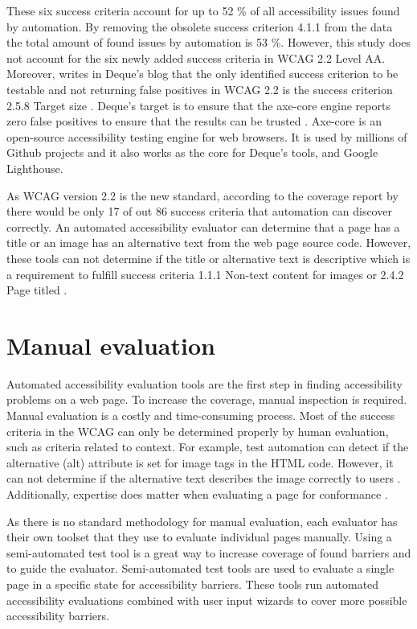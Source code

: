 These six success criteria account for up to 52 \% of all accessibility issues found by automation. By removing the obsolete success criterion 4.1.1 from the data the total amount of found issues by automation is 53 \%. However, this study does not account for the six newly added success criteria in WCAG 2.2 Level AA. Moreover, \textcite{dequeaxe4_5} writes in Deque's blog that the only identified success criterion to be testable and not returning false positives in WCAG 2.2 is the success criterion 2.5.8 Target size \citep{dequeaxe4_5}. Deque's target is to ensure that the axe-core engine reports zero false positives to ensure that the results can be trusted \citep{dequecoverage}. Axe-core is an open-source accessibility testing engine for web browsers. It is used by millions of Github projects and it also works as the core for Deque's tools, and Google Lighthouse. 

As WCAG version 2.2 is the new standard, according to the coverage report by \textcite{dequecoverage} there would be only 17 of out 86 success criteria that automation can discover correctly. An automated accessibility evaluator can determine that a page has a title or an image has an alternative text from the web page source code. However, these tools can not determine if the title or alternative text is descriptive which is a requirement to fulfill success criteria 1.1.1 Non-text content for images or 2.4.2 Page titled \citep{wcag_checklist}.

\section{Manual evaluation}

Automated accessibility evaluation tools are the first step in finding accessibility problems on a web page. To increase the coverage, manual inspection is required. Manual evaluation is a costly and time-consuming process. Most of the success criteria in the WCAG can only be determined properly by human evaluation, such as criteria related to context. For example, test automation can detect if the alternative (alt) attribute is set for image tags in the HTML code. However, it can not determine if the alternative text describes the image correctly to users \citep{comparison_10.1145/3371300.3383346}. Additionally, expertise does matter when evaluating a page for conformance \citep{10.1145/1878803.1878813_testability_expertise, comparative_accessibility_methods}.

As there is no standard methodology for manual evaluation, each evaluator has their own toolset that they use to evaluate individual pages manually. Using a semi-automated test tool is a great way to increase coverage of found barriers and to guide the evaluator. Semi-automated test tools are used to evaluate a single page in a specific state for accessibility barriers. These tools run automated accessibility evaluations combined with user input wizards to cover more possible accessibility barriers. 

